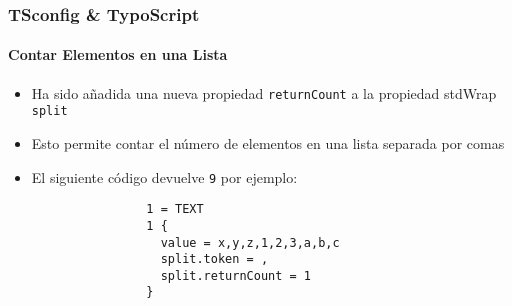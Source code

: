 \begin{frame}[fragile]
	\frametitle{TSconfig \& TypoScript}
	\framesubtitle{Contar Elementos en una Lista}

	\lstset{basicstyle=\tiny\ttfamily}

	\begin{itemize}

		\item Ha sido añadida una nueva propiedad \texttt{returnCount} a la propiedad stdWrap \texttt{split}

		\item Esto permite contar el número de elementos en una lista separada por comas

		\item El siguiente código devuelve \texttt{9} por ejemplo:

			\begin{lstlisting}
				1 = TEXT
				1 {
				  value = x,y,z,1,2,3,a,b,c
				  split.token = ,
				  split.returnCount = 1
				}
			\end{lstlisting}

	\end{itemize}

\end{frame}

